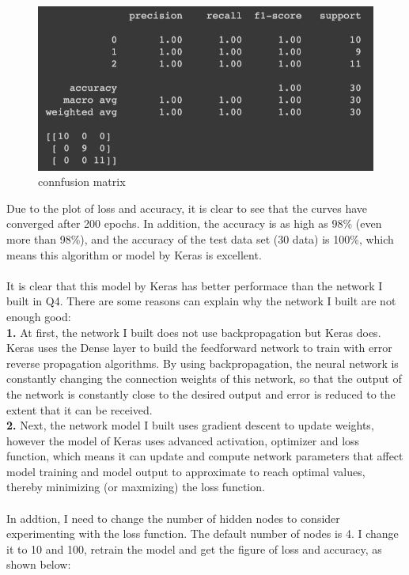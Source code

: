 \documentclass{article}
\begin{document}
\begin{figure}[H]
\centering
\includegraphics[scale=0.3]{./img/matrix.png}
\caption{connfusion matrix}
\end{figure}
\noindent
Due to the plot of loss and accuracy, it is clear to see that the curves have converged after 200 epochs. In addition, the accuracy is as high as 98\% (even more than 98\%), and the accuracy of the test data set (30 data) is 100\%, which means this algorithm or model by Keras is excellent.\\\\
It is clear that this model by Keras has better performace than the network I built in Q4. There are some reasons can explain why the network I built are not enough good:\\
\textbf{1.} At first, the network I built does not use backpropagation but Keras does. Keras uses the Dense layer to build the feedforward network to train with error reverse propagation algorithms. By using backpropagation, the neural network is constantly changing the connection weights of this network, so that the output of the network is constantly close to the desired output and error is reduced to the extent that it can be received.\\
\textbf{2.} Next, the network model I built uses gradient descent to update weights, however the model of Keras uses advanced activation, optimizer and loss function, which means it can update and compute network parameters that affect model training and model output to approximate to reach optimal values, thereby minimizing (or maxmizing) the loss function.\\\\
In addtion, I need to change the number of hidden nodes to consider experimenting with the loss function. The default number of nodes is 4. I change it to 10 and 100, retrain the model and get the figure of loss and accuracy, as shown below:
\end{document}
